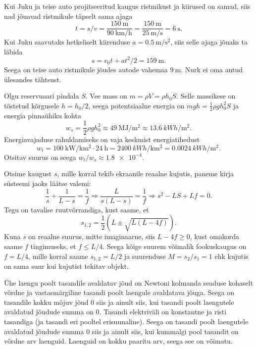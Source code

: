 \documentclass[10pt]{article}
\begin{document}
\solu
Kui Juku ja teise auto projitseeritud kaugus ristmikust ja kiirused on samad, siis nad jõuavad ristmikule täpselt sama ajaga
\[
t = s/v = \frac{\SI{150}{\meter}}{\SI{90}{\kilo\meter\per\hour}} = \frac{\SI{150}{\meter}}{\SI{25}{\meter\per\second}} = \SI{6}{\second}.
\]
Kui Juku saavutaks hetkeliselt kiirenduse $a = \SI{0.5}{\meter\per\second\squared}$, siis selle ajaga jõuaks ta läbida
\[
s = v_0 t + a t^2/2 = \SI{159}{\meter}.
\]
Seega on teise auto ristmikule jõudes autode vahemaa $\SI{9}{\meter}$. Nurk ei oma antud ülesandes tähtsust.
\probend
\bigskip


\solu
Olgu reservuaari pindala $S$. Vee mass on $m=\rho V=\rho h_0S$. Selle massikese on tõstetud kõrgusele $h=h_0/2$, seega potentsiaalne energia on $mgh=\frac{1}{2}\rho gh_0^2S$ ja energia pinnaühiku kohta
\[
w_s=\frac{1}{2}\rho gh_0^2\approx \SI{49}{\mega\joule\per\meter\squared}\approx\SI{13.6}{kWh\per\meter\squared}.
\]
Energiavajaduse rahuldamiseks on vaja keskmist energiatihedust
\[
w_t=\SI{100}{\kilo\watt\per\kilo\meter\squared}\cdot \SI{24}{\hour}=\SI{2400}{kWh\per\kilo\meter\squared}=\SI{0.0024}{kWh\per\meter\squared}.
\]
Otsitav suurus on seega $w_t/w_s\approx \num{1.8e-4}$.
\probend
\bigskip


\solu
Otsime kaugust $s$, mille korral tekib ekraanile reaalne kujutis, paneme kirja süsteemi jaoks läätse valemi:
$$
\frac{1}{s}+\frac{1}{L-s}=\frac{1}{f}\Rightarrow \frac{L}{s(L-s)}=\frac{1}{f} \Rightarrow s^2-LS+Lf=0.
$$
Tegu on tavalise ruutvõrrandiga, kust saame, et
$$
s_{1,2}=\frac{1}{2}\left(L\pm\sqrt{L(L-4f)}\right).
$$
Kuna $s$ on reaalne suurus, mitte imaginaarne, siis $L-4f \geq 0$, kust omakorda saame $f$ tingimuseks, et $f \leq L/4$. Seega kõige suurem võimalik fookuskaugus on $f = L/4$, mille korral saame $s_{1,2} = L/2$ ja suurenduse $M=s_2/s_1 = 1$ ehk kujutis on sama suur kui kujutist tekitav objekt.
\probend
\bigskip


\solu
Ühe laengu poolt tasandile avaldatav jõud on Newtoni kolmanda seaduse kohaselt võrdne ja vastasmärgiline tasandi poolt laengule avaldatava jõuga. Seega on tasandile kokku mõjuv jõud 0 siis ja ainult siis, kui tasandi poolt laengutele avaldatud jõudude summa on 0. Tasandi elektriväli on konstantne ja risti tasandiga (ja tasandi eri pooltel erisuunaline). Seega on tasandi poolt laengutele avaldatud jõudude summa 0 siis ja ainult siis, kui kummalgi pool tasandit on võrdne arv laenguid. Laenguid on kokku paaritu arv, seega see on võimatu.
\probend
\bigskip
\end{document}
